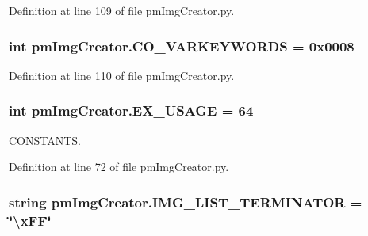 Definition at line 109 of file pm\-Img\-Creator.\-py.

\hypertarget{namespacepm_img_creator_a927722c1d6db6fd24a202b993d577616}{
\subsubsection[{C\-O\-\_\-\-V\-A\-R\-K\-E\-Y\-W\-O\-R\-D\-S}]{\setlength{\rightskip}{0pt plus 5cm}int pm\-Img\-Creator.\-C\-O\-\_\-\-V\-A\-R\-K\-E\-Y\-W\-O\-R\-D\-S = 0x0008}}\label{namespacepm_img_creator_a927722c1d6db6fd24a202b993d577616}


Definition at line 110 of file pm\-Img\-Creator.\-py.

\hypertarget{namespacepm_img_creator_a421674165be1a6c49d7bd770e0b3f592}{
\subsubsection[{E\-X\-\_\-\-U\-S\-A\-G\-E}]{\setlength{\rightskip}{0pt plus 5cm}int pm\-Img\-Creator.\-E\-X\-\_\-\-U\-S\-A\-G\-E = 64}}\label{namespacepm_img_creator_a421674165be1a6c49d7bd770e0b3f592}


C\-O\-N\-S\-T\-A\-N\-T\-S. 



Definition at line 72 of file pm\-Img\-Creator.\-py.

\hypertarget{namespacepm_img_creator_a1854dd7a5589f6b2b87ab4eea33eff4c}{
\subsubsection[{I\-M\-G\-\_\-\-L\-I\-S\-T\-\_\-\-T\-E\-R\-M\-I\-N\-A\-T\-O\-R}]{\setlength{\rightskip}{0pt plus 5cm}string pm\-Img\-Creator.\-I\-M\-G\-\_\-\-L\-I\-S\-T\-\_\-\-T\-E\-R\-M\-I\-N\-A\-T\-O\-R = \char`\"{}\textbackslash{}x\-F\-F\char`\"{}}}\label{namespacepm_img_creator_a1854dd7a5589f6b2b87ab4eea33eff4c}


